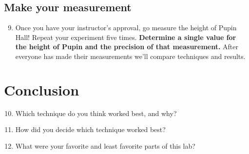 \documentclass[12pt]{article}%
\begin{document}
\subsection*{Make your measurement}

\begin{enumerate}
\setcounter{enumi}{8}
\item Once you have your instructor's approval, go measure the height of Pupin Hall! Repeat your experiment five times. \textbf{Determine a single value for the height of Pupin and the precision of that measurement.} After everyone has made their measurements we'll compare techniques and results.

\end{enumerate} 

\section{Conclusion}

\begin{enumerate}
\setcounter{enumi}{9}
\item Which technique do you think worked best, and why?

\item How did you decide which technique worked best?

\item What were your favorite and least favorite parts of this lab? 
\end{enumerate}


\end{document}
